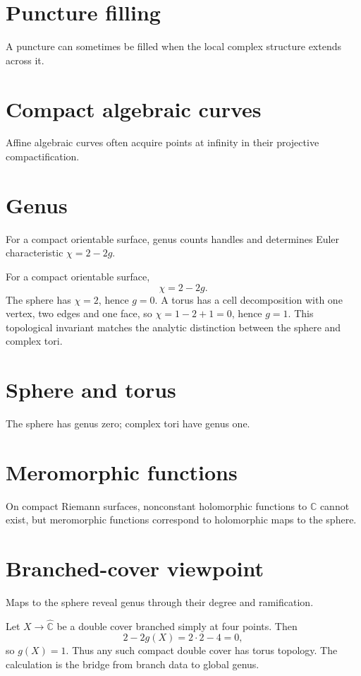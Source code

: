 \section{Puncture filling}
A puncture can sometimes be filled when the local complex structure extends across it.

\section{Compact algebraic curves}
Affine algebraic curves often acquire points at infinity in their projective compactification.

\section{Genus}
For a compact orientable surface, genus counts handles and determines Euler characteristic $\chi=2-2g$.

\begin{example}\label{ex:iv26-expand-02}
For a compact orientable surface,
\[
\chi=2-2g.
\]
The sphere has \(\chi=2\), hence \(g=0\). A torus has a cell decomposition with one vertex, two edges and one face, so \(\chi=1-2+1=0\), hence \(g=1\). This topological invariant matches the analytic distinction between the sphere and complex tori.
\end{example}
\section{Sphere and torus}
The sphere has genus zero; complex tori have genus one.

\section{Meromorphic functions}
On compact Riemann surfaces, nonconstant holomorphic functions to $\mathbb C$ cannot exist, but meromorphic functions correspond to holomorphic maps to the sphere.

\section{Branched-cover viewpoint}
Maps to the sphere reveal genus through their degree and ramification.

\begin{example}\label{ex:iv26-expand-03}
Let \(X\to\widehat{\mathbb C}\) be a double cover branched simply at four points. Then
\[
2-2g(X)=2\cdot2-4=0,
\]
so \(g(X)=1\). Thus any such compact double cover has torus topology. The calculation is the bridge from branch data to global genus.
\end{example}
